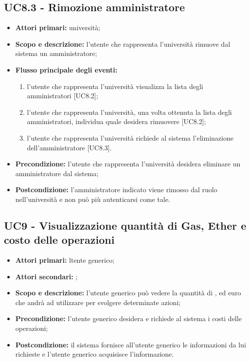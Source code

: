 \documentclass[AnalisiDeiRequisiti.tex]{subfiles}
\begin{document}
\subsection{UC8.3 - Rimozione amministratore}
\begin{itemize}
	\item \textbf{Attori primari:} università;\\
	\item \textbf{Scopo e descrizione:} l'utente che rappresenta l'università rimuove dal sistema un amministratore;\\
	\item \textbf{Flusso principale degli eventi:}\\
	\begin{enumerate}
		\item l'utente che rappresenta l'università  visualizza la lista degli amministratori [UC8.2];
		\item l'utente che rappresenta l'università, una volta ottenuta la lista degli amministratori, individua quale desidera rimuovere [UC8.2];\\
		\item l'utente che rappresenta l'università richiede al sistema l'eliminazione dell'amministratore [UC8.3].
	\end{enumerate}
	\item \textbf{Precondizione:} l'utente che rappresenta l'università desidera eliminare un amministratore dal sistema;\\
	\item \textbf{Postcondizione:} l'amministratore indicato viene rimosso dal ruolo nell'università e non può più autenticarsi come tale.\\
\end{itemize}

\subsection{UC9 - Visualizzazione quantità di Gas, Ether e costo delle operazioni}
\begin{itemize}
	\item \textbf{Attori primari:} ltente generico;\\
	\item \textbf{Attori secondari:} ;\\
	\item \textbf{Scopo e descrizione:} l'utente generico può vedere la quantità di ,  ed euro che andrà ad utilizzare per svolgere determinate azioni;\\
	\item \textbf{Precondizione:} l'utente generico desidera e richiede al sistema i costi delle operazioni;\\
	\item \textbf{Postcondizione:} il sistema fornisce all'utente generico le informazioni da lui richieste e l'utente generico acquisisce l'informazione.\\
\end{itemize}
\end{document}
